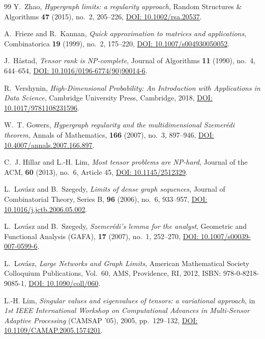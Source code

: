 \documentclass[11pt,a4paper,reqno]{amsart}
\theoremstyle{definition}
\numberwithin{equation}{section}
\begin{document}
\begin{thebibliography}{99}
Y.~Zhao,
\emph{Hypergraph limits: a regularity approach},
Random Structures \& Algorithms \textbf{47} (2015), no.~2, 205--226,
\href{https://doi.org/10.1002/rsa.20537}{DOI: 10.1002/rsa.20537}.

A.~Frieze and R.~Kannan,
\emph{Quick approximation to matrices and applications},
Combinatorica \textbf{19} (1999), no.~2, 175--220,
\href{https://doi.org/10.1007/s004930050052}{DOI: 10.1007/s004930050052}.

J.~H{\aa}stad,
\emph{Tensor rank is NP-complete},
Journal of Algorithms \textbf{11} (1990), no.~4, 644--654,
\href{https://doi.org/10.1016/0196-6774(90)90014-6}{DOI: 10.1016/0196-6774(90)90014-6}.

R.~Vershynin,
\emph{High-Dimensional Probability: An Introduction with Applications in Data Science},
Cambridge University Press, Cambridge, 2018,
\href{https://doi.org/10.1017/9781108231596}{DOI: 10.1017/9781108231596}.

W.~T. Gowers,
\emph{Hypergraph regularity and the multidimensional Szemer{\'e}di theorem},
Annals of Mathematics, \textbf{166} (2007), no.~3, 897--946,
\href{https://doi.org/10.4007/annals.2007.166.897}{DOI: 10.4007/annals.2007.166.897}.

C.~J. Hillar and L.-H. Lim,
\emph{Most tensor problems are NP-hard},
Journal of the ACM, \textbf{60} (2013), no.~6, Article 45,
\href{https://doi.org/10.1145/2512329}{DOI: 10.1145/2512329}.

L.~Lov{\'a}sz and B.~Szegedy,
\emph{Limits of dense graph sequences},
Journal of Combinatorial Theory, Series B, \textbf{96} (2006), no.~6, 933--957,
\href{https://doi.org/10.1016/j.jctb.2006.05.002}{DOI: 10.1016/j.jctb.2006.05.002}.

L.~Lov{\'a}sz and B.~Szegedy,
\emph{Szemer{\'e}di's lemma for the analyst},
Geometric and Functional Analysis (GAFA), \textbf{17} (2007), no.~1, 252--270,
\href{https://doi.org/10.1007/s00039-007-0599-6}{DOI: 10.1007/s00039-007-0599-6}.

L.~Lov{\'a}sz,
\emph{Large Networks and Graph Limits},
American Mathematical Society Colloquium Publications, Vol.~60, AMS, Providence, RI, 2012,
ISBN: 978-0-8218-9085-1,
\href{https://doi.org/10.1090/coll/060}{DOI: 10.1090/coll/060}.

L.-H. Lim,
\emph{Singular values and eigenvalues of tensors: a variational approach},
in \emph{1st IEEE International Workshop on Computational Advances in Multi-Sensor Adaptive Processing} (CAMSAP '05), 2005, pp.~129--132,
\href{https://doi.org/10.1109/CAMAP.2005.1574201}{DOI: 10.1109/CAMAP.2005.1574201}.


\end{thebibliography}
\end{document}
